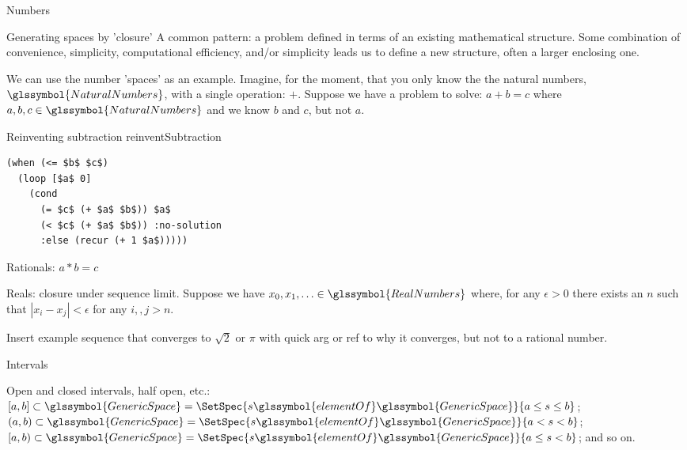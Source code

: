 \begin{plSection}{Numbers}
\begin{plSection}{Generating spaces by 'closure'}
A common pattern: a problem defined in terms of an existing mathematical
structure. Some combination of convenience, simplicity, computational
efficiency, and/or simplicity leads us to define a new structure, 
often a larger enclosing one.

We can use the number 'spaces' as an example.
Imagine, for the moment, that you only know the 
the natural numbers, $\glssymbol{NaturalNumbers}$, with a single operation: $+$.
Suppose we have a problem to solve:
\begin{math}
a + b = c
\end{math}
where $a,b,c\in \glssymbol{NaturalNumbers}$ and we know $b$ and $c$,
but not $a$.

\begin{plListing}
{Reinventing subtraction}
{reinventSubtraction}
\begin{lstlisting}
(when (<= $b$ $c$)
  (loop [$a$ 0]
    (cond 
      (= $c$ (+ $a$ $b$)) $a$
      (< $c$ (+ $a$ $b$)) :no-solution
      :else (recur (+ 1 $a$)))))
\end{lstlisting}
\end{plListing}

Rationals: 
\begin{math}
a * b = c
\end{math}

Reals: closure under sequence limit.
Suppose we have $x_0, x_1, \ldots \in \glssymbol{RealNumbers}$
where, for any $\epsilon>0$ there exists an $n$ such that
$|x_i - x_j| < \epsilon$ for any $i,, j > n$.

Insert example sequence that converges to $\sqrt{2}$ or $\pi$
with quick arg or ref to why it converges, but not to a rational
number.

\end{plSection}%
\begin{plSection}{Intervals}

Open and closed intervals, half open, etc.:
$[a,b] \subset \glssymbol{GenericSpace} = 
\SetSpec{s \glssymbol{elementOf} \glssymbol{GenericSpace}}
{a \leq s \leq b}$;
$(a,b) \subset \glssymbol{GenericSpace} = 
\SetSpec{s \glssymbol{elementOf} \glssymbol{GenericSpace}}
{a < s < b}$;
$[a,b) \subset \glssymbol{GenericSpace} = 
\SetSpec{s \glssymbol{elementOf} \glssymbol{GenericSpace}}
{a \leq s < b}$;
and so on.


\end{plSection}
\end{plSection}
